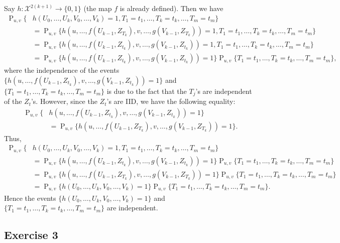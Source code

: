 \documentclass[12pt]{article}
\DeclareMathOperator{\Prob}{P}
\begin{document}
Say $h : \mathcal{X}^{2(k+1)} \to \{0, 1\}$ (the map $f$ is already defined). Then we have
\begin{align*}
\Prob_{u, v}\{&h(U_0, \ldots, U_k, V_0, \ldots, V_k) = 1, T_1 = t_1, \ldots, T_k = t_k, \ldots, T_m = t_m\} \\
&= \Prob_{u, v}\{h(u, \ldots, f(U_{k-1}, Z_{T_k}), v, \ldots, g(V_{k-1}, Z_{T_k})) = 1, T_1 = t_1, \ldots, T_k = t_k, \ldots, T_m = t_m\} \\
&= \Prob_{u, v}\{h(u, \ldots, f(U_{k-1}, Z_{t_k}), v, \ldots, g(V_{k-1}, Z_{t_k})) = 1, T_1 = t_1, \ldots, T_k = t_k, \ldots, T_m = t_m\} \\
&= \Prob_{u, v}\{h(u, \ldots, f(U_{k-1}, Z_{t_k}), v, \ldots, g(V_{k-1}, Z_{t_k})) = 1\} \Prob_{u, v}\{T_1 = t_1, \ldots, T_k = t_k, \ldots, T_m = t_m\},
\end{align*}
where the independence of the events $\{h(u, \ldots, f(U_{k-1}, Z_{t_k}), v, \ldots, g(V_{k-1}, Z_{t_k})) = 1\}$ and $\{T_1 = t_1, \ldots, T_k = t_k, \ldots, T_m = t_m\}$ is due to the fact that the $T_j$'s are independent of the $Z_t$'s. However, since the $Z_t$'s are IID, we have the following equality:
\begin{align*}
\Prob_{u, v}\{&h(u, \ldots, f(U_{k-1}, Z_{t_k}), v, \ldots, g(V_{k-1}, Z_{t_k})) = 1\} \\
&= \Prob_{u, v}\{h(u, \ldots, f(U_{k-1}, Z_{T_k}), v, \ldots, g(V_{k-1}, Z_{T_k})) = 1\}.
\end{align*}
Thus,
\begin{align*}
\Prob_{u, v}\{&h(U_0, \ldots, U_k, V_0, \ldots, V_k) = 1, T_1 = t_1, \ldots, T_k = t_k, \ldots, T_m = t_m\} \\
&= \Prob_{u, v}\{h(u, \ldots, f(U_{k-1}, Z_{t_k}), v, \ldots, g(V_{k-1}, Z_{t_k})) = 1\} \Prob_{u, v}\{T_1 = t_1, \ldots, T_k = t_k, \ldots, T_m = t_m\} \\
&= \Prob_{u, v}\{h(u, \ldots, f(U_{k-1}, Z_{T_k}), v, \ldots, g(V_{k-1}, Z_{T_k})) = 1\} \Prob_{u, v}\{T_1 = t_1, \ldots, T_k = t_k, \ldots, T_m = t_m\} \\
&= \Prob_{u, v}\{h(U_0, \ldots, U_k, V_0, \ldots, V_k) = 1\} \Prob_{u, v}\{T_1 = t_1, \ldots, T_k = t_k, \ldots, T_m = t_m\}.
\end{align*}
Hence the events $\{h(U_0, \ldots, U_k, V_0, \ldots, V_k) = 1\}$ and $\{T_1 = t_1, \ldots, T_k = t_k, \ldots, T_m = t_m\}$ are independent.

\subsection*{Exercise 3}
\end{document}

